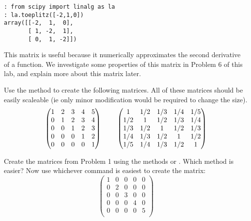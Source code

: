 \begin{lstlisting}[style=python]
: from scipy import linalg as la
: la.toeplitz([-2,1,0])
array([[-2,  1,  0],
       [ 1, -2,  1],
       [ 0,  1, -2]])
\end{lstlisting}

This matrix is useful because it numerically approximates the second derivative of a function. We investigate some properties of this matrix in Problem 6 of this lab, and explain more about this matrix later.

\begin{problem}
Use the  method to create the following matrices. All of these matrices should be easily scaleable (ie only minor modification would be required to change the size).
\[
\begin{pmatrix}
1&2&3&4&5\\
0&1&2&3&4\\
0&0&1&2&3 \\
0&0&0&1&2 \\
0&0&0&0&1 \\
\end{pmatrix}
\hspace{8mm}
\begin{pmatrix}
1&1/2&1/3 & 1/4 &1/5\\
1/2&1&1/2&1/3&1/4\\
1/3&1/2&1&1/2&1/3 \\
1/4&1/3&1/2&1&1/2 \\
1/5&1/4&1/3&1/2&1 \\
\end{pmatrix}
\]
\end{problem}

\begin{problem}
Create the matrices from Problem 1 using the methods  or . Which method is easier? Now use whichever command is easiest to create the matrix:
\[
\begin{pmatrix}
1&0&0&0&0\\
0&2&0&0&0\\
0&0&3&0&0 \\
0&0&0&4&0 \\
0&0&0&0&5 \\
\end{pmatrix}
\]
\end{problem}
 
\begin{comment}
\begin{problem}
Write a function that will create a matrix of size $n$ that has ones on the diagonal and has normally-distributed random entries in the last two columns and the last two rows.
\end{problem}
\end{comment}

